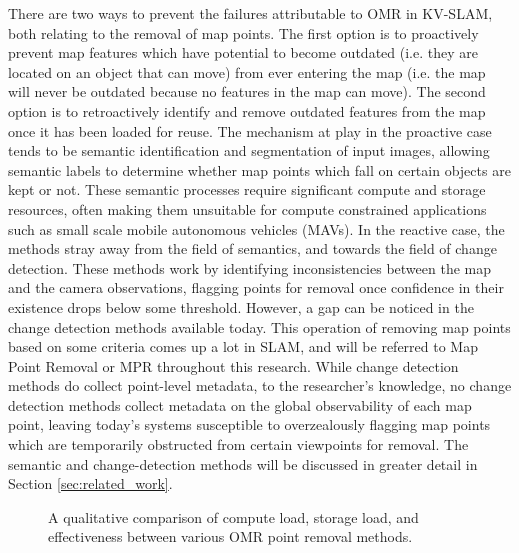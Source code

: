 There are two ways to prevent the failures attributable to OMR in KV-SLAM, both relating to the removal of map points. The first option is to proactively prevent map features which have potential to become outdated (i.e. they are located on an object that can move) from ever entering the map (i.e. the map will never be outdated because no features in the map can move). The second option is to retroactively identify and remove outdated features from the map once it has been loaded for reuse. The mechanism at play in the proactive case tends to be semantic identification and segmentation of input images, allowing semantic labels to determine whether map points which fall on certain objects are kept or not. These semantic processes require significant compute and storage resources, often making them unsuitable for compute constrained applications such as small scale mobile autonomous vehicles (MAVs). In the reactive case, the methods stray away from the field of semantics, and towards the field of change detection. These methods work by identifying inconsistencies between the map and the camera observations, flagging points for removal once confidence in their existence drops below some threshold. However, a gap can be noticed in the change detection methods available today. This operation of removing map points based on some criteria comes up a lot in SLAM, and will be referred to Map Point Removal or MPR throughout this research. While change detection methods do collect point-level metadata, to the researcher's knowledge, no change detection methods collect metadata on the global observability of each map point, leaving today's systems susceptible to overzealously flagging map points which are temporarily obstructed from certain viewpoints for removal. The semantic and change-detection methods will be discussed in greater detail in Section \ref{sec:related_work}.

\begin{figure}[]
    \centering
    \caption[OMR Method Comparison]{A qualitative comparison of compute load, storage load, and effectiveness between various OMR point removal methods.}
    \label{fig:omr_method_comparison}
\end{figure}

